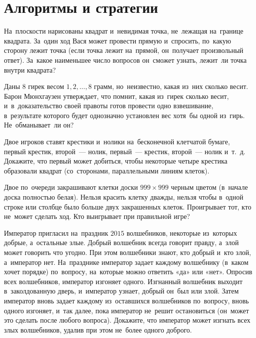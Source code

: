 
\section*{Алгоритмы и стратегии}


\begin{problems}

\item
На~плоскости нарисованы квадрат и~невидимая точка, не~лежащая на~границе
квадрата.
За~один ход Вася может провести прямую и~спросить, по~какую сторону лежит точка
(если точка лежит на~прямой, он~получает произвольный ответ).
За~какое наименьшее число вопросов он~сможет узнать, лежит~ли точка внутри
квадрата?

\item
Даны 8 гирек весом $1, 2, \ldots, 8$ грамм, но~неизвестно, какая из~них
сколько весит.
Барон Мюнхгаузен утверждает, что помнит, какая из~гирек сколько весит,
и~в~доказательство своей правоты готов провести одно взвешивание, в~результате
которого будет однозначно установлен вес хотя~бы одной из~гирь.
Не~обманывает~ли он?

\item
Двое игроков ставят крестики и~нолики на~бесконечной клетчатой бумаге, первый
крестик, второй~— нолик, первый~— крестик, второй~— нолик и~т.~д.
Докажите, что первый может добиться, чтобы некоторые четыре крестика образовали
квадрат (со~сторонами, параллельными линиям клеток).

\item
Двое по~очереди закрашивают клетки доски $999 \times 999$ черным цветом
(в~начале доска полностью белая).
Нельзя красить клетку дважды, нельзя чтобы в~одной строке или столбце было
больше двух закрашенных клеток.
Проигрывает тот, кто не~может сделать ход.
Кто выигрывает при правильной игре?

\item
Император пригласил на~праздник $2015$ волшебников, некоторые из~которых
добрые, а~остальные злые.
Добрый волшебник всегда говорит правду, а~злой может говорить что угодно.
При этом волшебники знают, кто добрый и~кто злой, а~император нет.
На~празднике император задает каждому волшебнику (в~каком хочет порядке)
по~вопросу, на~которые можно ответить «да» или «нет».
Опросив всех волшебников, император изгоняет одного.
Изгнанный волшебник выходит в~заколдованную дверь, и~император узнает, добрый
он~был или злой.
Затем император вновь задает каждому из~оставшихся волшебников по~вопросу,
вновь одного изгоняет, и~так далее, пока император не~решит остановиться
(он~может это сделать после любого вопроса).
Докажите, что император может изгнать всех злых волшебников, удалив при этом
не~более одного доброго.


\end{problems}
